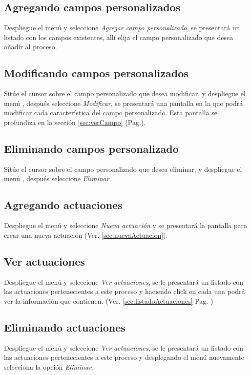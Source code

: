 \guardarVer

\subsection{Agregando campos personalizados}
\label{sec:agregarCamposProceso}
Despliegue el men\'u \blackberry y seleccione \emph{Agregar campo personalizado}, se
presentar\'a un listado con los campos existentes, all\'i elija el campo
personalizado que desea a\~nadir al proceso.

\subsection{Modificando campos personalizados}
\label{sec:modificarCamposProceso}
Sit\'ue el cursor sobre el campo personalizado que desea modificar, y despliegue el
men\'u \blackberry, despu\'es seleccione \emph{Modificar},
se presentar\'a una pantalla en la que podr\'a modificar cada caracter\'istica
del campo personalizado. Esta pantalla se profundiza en la secci\'on
\ref{sec:verCampo} (Pag.\pageref{sec:verCampo}).

\subsection{Eliminando campos personalizado}
\label{sec:eliminarCamposProceso}
Sit\'ue el cursor sobre el campo personalizado que desea eliminar, y despliegue el
men\'u \blackberry, despu\'es seleccione \emph{Eliminar}.

\subsection{Agregando actuaciones}
\label{sec:agregarActuacionesProceso}
Despliegue el men\'u \blackberry y seleccione \emph{Nueva actuaci\'on} y se
presentar\'a la pantalla para crear una nueva actuaci\'on (Ver.
\ref{sec:nuevaActuacion}).

\subsection{Ver actuaciones}
\label{sec:verActuacionesProceso}
Despliegue el men\'u \blackberry y seleccione \emph{Ver actuaciones}, se le
presentar\'a un listado con las actuaciones pertenecientes a este proceso y
haciendo click en cada una podr\'a ver la informaci\'on que contienen. (Ver.
\ref{sec:listadoActuaciones} Pag. \pageref{sec:listadoActuaciones})

\subsection{Eliminando actuaciones}
\label{sec:eliminarActuacionesProceso}
Despliegue el men\'u \blackberry y seleccione \emph{Ver actuaciones}, se le
presentar\'a un listado con las actuaciones pertenecientes a este proceso y
desplegando el men\'u \blackberry nuevamente selecciona la opci\'on
\emph{Eliminar}.
